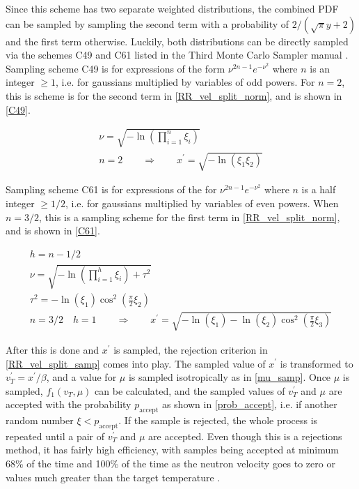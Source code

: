 Since this scheme has two separate weighted distributions, the combined PDF can be sampled by sampling the second term with a probability of $2/(\sqrt{\pi}y+2)$ and the first term otherwise.  Luckily, both distributions can be directly sampled via the schemes C49 and C61 listed in the Third Monte Carlo Sampler manual \cite{3rdsampler}.  Sampling scheme C49 is for expressions of the form $\nu^{2n-1}e^{-\nu^2}$ where $n$ is an integer $\ge 1$, i.e. for gaussians multiplied by variables of odd powers.  For $n=2$, this is scheme is for the second term in \eqref{RR_vel_split_norm}, and is shown in \eqref{C49}.

\begin{equation}
\label{C49}
\begin{gathered}
\nu = \sqrt{- \ln \left( \prod_{i=1}^n \xi_i \right)} \\ 
n = 2 \qquad \Rightarrow \qquad x^\prime = \sqrt{- \ln \left( \xi_1 \xi_2 \right)}
\end{gathered}
\end{equation}

Sampling scheme C61 is for expressions of the for $\nu^{2n-1}e^{-\nu^2}$ where $n$ is a half integer $\ge 1/2$, i.e. for gaussians multiplied by variables of even powers.  When $n=3/2$, this is a sampling scheme for the first term in \eqref{RR_vel_split_norm}, and is shown in \eqref{C61}.

\begin{equation}
\label{C61}
\begin{gathered}
h = n-1/2 \\
\nu = \sqrt{- \ln \left( \prod_{i=1}^h \xi_i  \right)+ \tau^2} \\ 
\tau^2 = -\ln(\xi_1) \cos^2(\frac{\pi}{2}\xi_2)\\
n = 3/2 \quad h=1 \qquad \Rightarrow \qquad x^\prime =   \sqrt{- \ln( \xi_1) - \ln(\xi_2) \cos^2(\frac{\pi}{2}\xi_3)}
\end{gathered}
\end{equation}

After this is done and $x^\prime$ is sampled, the rejection criterion in \eqref{RR_vel_split_samp} comes into play.  The sampled value of $x^\prime$ is transformed to $v_T^\prime=x^\prime/\beta$, and a value for $\mu$ is sampled isotropically as in \eqref{mu_samp}.  Once $\mu$ is sampled, $f_1(v_T,\mu)$ can be calculated, and the sampled values of $v_T^\prime$ and $\mu$ are accepted with the probability $p_\mathrm{accept}$ as shown in \eqref{prob_accept}, i.e. if another random number $\xi<p_\mathrm{accept}$.  If the sample is rejected, the whole process is repeated until a pair of $v_T^\prime$ and $\mu$ are accepted.  Even though this is a rejections method, it has fairly high efficiency, with samples being accepted at minimum 68\% of the time and 100\% of the time as the neutron velocity goes to zero or values much greater than the target temperature \cite{mcnp}.

